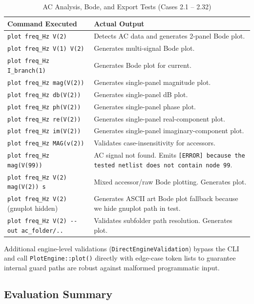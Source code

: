 \begin{table}[H]
\centering
\caption{AC Analysis, Bode, and Export Tests (Cases 2.1 -- 2.32)}
\label{tab:tests-case2}
\footnotesize
\begin{tabularx}{\textwidth}{p{6.5cm} X}
\toprule
\textbf{Command Executed} & \textbf{Actual Output} \\
\midrule
\texttt{plot freq\_Hz V(2) } & Detects AC data and generates 2-panel Bode plot. \\
\texttt{plot freq\_Hz V(1) V(2) } & Generates multi-signal Bode plot. \\
\texttt{plot freq\_Hz I\_branch(1) } & Generates Bode plot for current. \\
\texttt{plot freq\_Hz mag(V(2)) } & Generates single-panel magnitude plot. \\
\texttt{plot freq\_Hz db(V(2)) } & Generates single-panel dB plot. \\
\texttt{plot freq\_Hz ph(V(2)) } & Generates single-panel phase plot. \\
\texttt{plot freq\_Hz re(V(2)) } & Generates single-panel real-component plot. \\
\texttt{plot freq\_Hz im(V(2)) } & Generates single-panel imaginary-component plot. \\
\texttt{plot freq\_Hz MAG(v(2)) } & Validates case-insensitivity for accessors. \\
\texttt{plot freq\_Hz mag(V(99)) } & AC signal not found. Emits \texttt{[ERROR] because the tested netlist does not contain node 99}. \\
\texttt{plot freq\_Hz V(2) mag(V(2)) s} & Mixed accessor/raw Bode plotting. Generates plot. \\
\texttt{plot freq\_Hz V(2)} (gnuplot hidden) & Generates ASCII art Bode plot fallback because we hide gnuplot path in test. \\
\texttt{plot freq\_Hz V(2) -{}-out ac\_folder/..} & Validates subfolder path resolution. Generates plot. \\
\bottomrule
\end{tabularx}
\end{table}

Additional engine-level validations (\texttt{DirectEngineValidation}) bypass the CLI and call \texttt{PlotEngine::plot()} directly with edge-case token lists to guarantee internal guard paths are robust against malformed programmatic input.
\subsection{Evaluation Summary}
\label{subsec:validation-summary}

